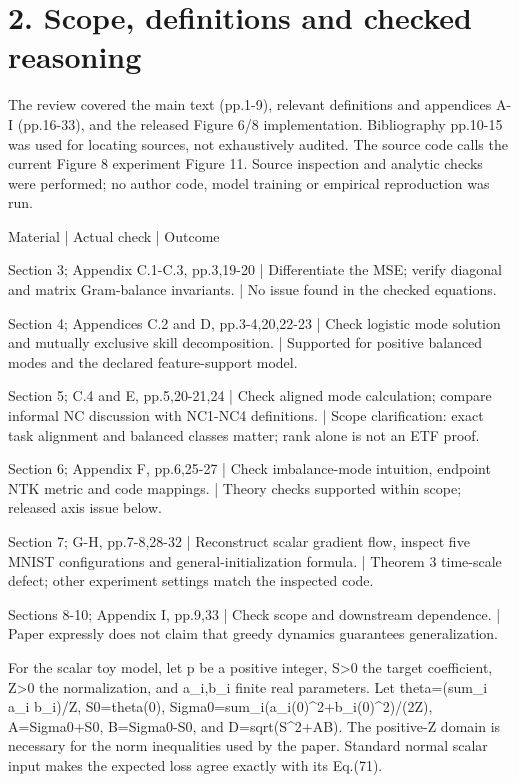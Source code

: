 \documentclass[10pt]{article}
\begin{document}
\section*{2. Scope, definitions and checked reasoning}
The review covered the main text (pp.1-9), relevant definitions and appendices A-I (pp.16-33), and the released Figure 6/8 implementation. Bibliography pp.10-15 was used for locating sources, not exhaustively audited. The source code calls the current Figure 8 experiment Figure 11. Source inspection and analytic checks were performed; no author code, model training or empirical reproduction was run.\par
Material | Actual check | Outcome\par
Section 3; Appendix C.1-C.3, pp.3,19-20 | Differentiate the MSE; verify diagonal and matrix Gram-balance invariants. | No issue found in the checked equations.\par
Section 4; Appendices C.2 and D, pp.3-4,20,22-23 | Check logistic mode solution and mutually exclusive skill decomposition. | Supported for positive balanced modes and the declared feature-support model.\par
Section 5; C.4 and E, pp.5,20-21,24 | Check aligned mode calculation; compare informal NC discussion with NC1-NC4 definitions. | Scope clarification: exact task alignment and balanced classes matter; rank alone is not an ETF proof.\par
Section 6; Appendix F, pp.6,25-27 | Check imbalance-mode intuition, endpoint NTK metric and code mappings. | Theory checks supported within scope; released axis issue below.\par
Section 7; G-H, pp.7-8,28-32 | Reconstruct scalar gradient flow, inspect five MNIST configurations and general-initialization formula. | Theorem 3 time-scale defect; other experiment settings match the inspected code.\par
Sections 8-10; Appendix I, pp.9,33 | Check scope and downstream dependence. | Paper expressly does not claim that greedy dynamics guarantees generalization.\par
For the scalar toy model, let p be a positive integer, S>0 the target coefficient, Z>0 the normalization, and a\_i,b\_i finite real parameters. Let theta=(sum\_i a\_i b\_i)/Z, S0=theta(0), Sigma0=sum\_i(a\_i(0)\textasciicircum{}2+b\_i(0)\textasciicircum{}2)/(2Z), A=Sigma0+S0, B=Sigma0-S0, and D=sqrt(S\textasciicircum{}2+AB). The positive-Z domain is necessary for the norm inequalities used by the paper. Standard normal scalar input makes the expected loss agree exactly with its Eq.(71).\par
\end{document}
